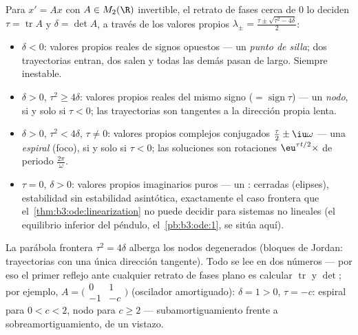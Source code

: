\begin{example}
\label{ex:b3:ode:planeclassification}
Para $x' = Ax$ con $A \in M_2(\R)$ invertible, el retrato de fases cerca
de $0$ lo deciden $\tau = \operatorname{tr}A$ y $\delta = \det A$, a
través de los valores propios $\lambda_\pm
= \frac{\tau \pm \sqrt{\tau^2 - 4\delta}}2$:
\begin{itemize}
  \item $\delta < 0$: valores propios reales de signos opuestos --- un
  \emph{punto de silla}; dos trayectorias entran, dos salen y todas las
  demás pasan de largo. Siempre inestable. \item $\delta > 0$,
  $\tau^2 \geq 4\delta$: valores propios reales del mismo signo
  ($= \operatorname{sign}\tau$) --- un \emph{nodo},
   si y solo si $\tau < 0$; las
  trayectorias son tangentes a la dirección propia lenta.
  \item $\delta > 0$, $\tau^2 < 4\delta$, $\tau \neq 0$:
        valores propios complejos conjugados $\frac\tau2 \pm
        \iu\omega$ --- una \emph{espiral} (foco),
         si y solo si $\tau < 0$;
        las soluciones son rotaciones $\eu^{\tau t/2}\times$ de periodo
        $\frac{2\pi}\omega$.
  \item $\tau = 0$, $\delta > 0$: valores propios imaginarios puros ---
  un \emph{}:
   cerradas (elipses), estabilidad
  sin estabilidad asintótica, exactamente el caso frontera que
  el~\cref{thm:b3:ode:linearization} no puede decidir para sistemas no
  lineales (el equilibrio inferior del péndulo, el~\cref{pb:b3:ode:1},
  se sitúa aquí).
\end{itemize}
La parábola frontera $\tau^2 = 4\delta$ alberga los nodos degenerados
(bloques de Jordan: trayectorias con una única dirección tangente). Todo
se lee en dos números --- por eso el primer reflejo ante cualquier
retrato de fases plano es calcular $\operatorname{tr}$ y $\det$; por
ejemplo, $A = \bigl(\begin{smallmatrix}0 & 1\\ -1 &
-c\end{smallmatrix}\bigr)$ (oscilador amortiguado): $\delta = 1 >
0$, $\tau = -c$: espiral  para
$0 < c < 2$, nodo  para $c \geq 2$
--- subamortiguamiento frente a sobreamortiguamiento, de un vistazo.
\end{example}

